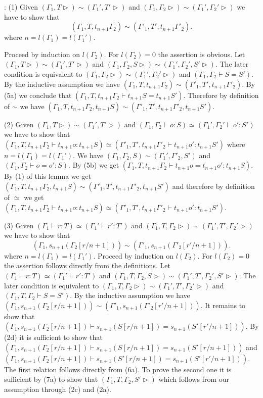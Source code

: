 \documentclass[11pt]{article}
\newenvironment{proof}{{\bf Proof}:}{\vskip 5mm }
\begin{document}
\begin{proof}
(1) Given $(\Gamma_1,T\rhd)\sim(\Gamma_1',T'\rhd)$ and $(\Gamma_1,\Gamma_2\rhd)\sim(\Gamma_1',\Gamma_2'\rhd)$ we have to show that 
%
$$(\Gamma_1,T,t_{n+1}\Gamma_2)\sim (\Gamma'_1,T',t_{n+1}\Gamma'_2).$$
%
where $n=l(\Gamma_1)=l(\Gamma_1')$.

Proceed by induction on $l(\Gamma_2)$. For $l(\Gamma_2)=0$ the assertion is obvious. Let  $(\Gamma_1,T\rhd)\sim(\Gamma_1',T'\rhd)$ and $(\Gamma_1,\Gamma_2,S\rhd)\sim(\Gamma_1',\Gamma_2',S'\rhd)$. The later condition is equivalent to $(\Gamma_1,\Gamma_2\rhd)\sim(\Gamma_1',\Gamma_2'\rhd)$  and $(\Gamma_1,\Gamma_2\vdash S=S')$. By the inductive assumption we have $(\Gamma_1,T,t_{n+1}\Gamma_2)\sim (\Gamma'_1,T',t_{n+1}\Gamma'_2)$. By (5a) we conclude that $(\Gamma_1,T,t_{n+1}\Gamma_2\vdash t_{n+1}S=t_{n+1}S')$. Therefore by definition of $\sim$ we have $(\Gamma_1,T,t_{n+1}\Gamma_2,t_{n+1}S)\sim(\Gamma'_1,T',t_{n+1}\Gamma'_2, t_{n+1}S')$.

(2) Given $(\Gamma_1,T\rhd)\sim(\Gamma_1',T'\rhd)$ and $(\Gamma_1,\Gamma_2\vdash o:S)\simeq(\Gamma_1',\Gamma_2'\vdash o':S')$ we have to show that $(\Gamma_1,T,t_{n+1}\Gamma_2\vdash t_{n+1}o:t_{n+1}S)\simeq (\Gamma'_1,T',t_{n+1}\Gamma'_2\vdash t_{n+1}o':t_{n+1}S')$ where $n=l(\Gamma_1)=l(\Gamma_1')$. We have $(\Gamma_1,\Gamma_2,S)\sim(\Gamma_1',\Gamma'_2,S')$ and $(\Gamma_1,\Gamma_2\vdash o=o':S)$. By (5b) we get $(\Gamma_1,T, t_{n+1}\Gamma_2\vdash t_{n+1}o=t_{n+1}o':t_{n+1}S)$. By (1) of this lemma we get $(\Gamma_1,T,t_{n+1}\Gamma_2,t_{n+1}S)\sim(\Gamma'_1,T',t_{n+1}\Gamma'_2,t_{n+1}S')$ and therefore by definition of $\simeq$ we get $(\Gamma_1,T,t_{n+1}\Gamma_2\vdash t_{n+1}o:t_{n+1}S)\simeq (\Gamma'_1,T',t_{n+1}\Gamma'_2\vdash t_{n+1}o':t_{n+1}S')$.

(3) Given $(\Gamma_1\vdash r:T)\simeq(\Gamma_1'\vdash r':T')$ and $(\Gamma_1,T,\Gamma_2\rhd)\sim(\Gamma_1',T',\Gamma_2'\rhd)$ we have to show that 
%
$$(\Gamma_1,s_{n+1}(\Gamma_2[r/n+1]))\sim(\Gamma'_1,s_{n+1}(\Gamma'_2[r'/n+1])).$$
%
where $n=l(\Gamma_1)=l(\Gamma_1')$. Proceed by induction on $l(\Gamma_2)$. For $l(\Gamma_2)=0$ the assertion follows directly from the definitions. Let $(\Gamma_1\vdash r:T)\simeq(\Gamma_1'\vdash r':T')$ and $(\Gamma_1,T,\Gamma_2,S\rhd)\sim(\Gamma_1',T',\Gamma_2',S'\rhd)$. The later condition is equivalent to $(\Gamma_1,T,\Gamma_2\rhd)\sim(\Gamma_1',T',\Gamma_2'\rhd)$  and $(\Gamma_1,T,\Gamma_2\vdash S=S')$. By the inductive assumption we have $(\Gamma_1,s_{n+1}(\Gamma_2[r/n+1]))\sim(\Gamma'_1,s_{n+1}(\Gamma'_2[r'/n+1]))$. It remains to show that $(\Gamma_1,s_{n+1}(\Gamma_2[r/n+1])\vdash s_{n+1}(S[r/n+1])=s_{n+1}(S'[r'/n+1]))$. By (2d) it is sufficient to show that $(\Gamma_1,s_{n+1}(\Gamma_2[r/n+1])\vdash s_{n+1}(S[r/n+1])=s_{n+1}(S'[r/n+1]))$ and $(\Gamma_1,s_{n+1}(\Gamma_2[r/n+1])\vdash s_{n+1}(S'[r/n+1])=s_{n+1}(S'[r'/n+1]))$. The first relation follows directly from (6a). To prove the second one it is sufficient by (7a) to show that $(\Gamma_1,T,\Gamma_2,S'\rhd)$ which follows from our assumption through (2c) and (2a). 


\end{proof}
\end{document}
